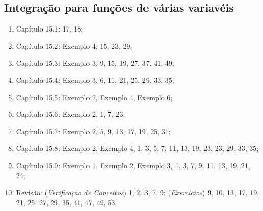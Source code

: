 \documentclass[11pt]{article}
\begin{document}
    \subsection{Integração para funções de várias variavéis}
    
     \begin{enumerate}
     \item Capítulo 15.1: 17, 18;
     \item Capítulo 15.2: Exemplo 4, 15, 23, 29;
     \item Capítulo 15.3: Exemplo 3, 9, 15, 19, 27, 37, 41, 49;
     \item Capítulo 15.4: Exemplo 3, 6, 11, 21, 25, 29, 33, 35;
     \item Capítulo 15.5: Exemplo 2, Exemplo 4, Exemplo 6;
     \item Capítulo 15.6: Exemplo 2, 1, 7, 23;
     \item Capítulo 15.7: Exemplo 2, 5, 9, 13, 17, 19, 25, 31;
     \item Capítulo 15.8: Exemplo 2, Exemplo 4, 1, 3, 5, 7, 11, 13, 19, 23, 23, 29, 33, 35; 
    \item Capítulo 15.9: Exemplo 1, Exemplo 2, Exemplo 3, 1, 3, 7, 9, 11, 13, 19, 21, 24; 
    \item Revisão: ({\it Verificação de Conceitos}) 1, 2, 3, 7, 9; ({\it Exercícios}) 9, 10, 13, 17, 19, 21, 25, 27, 29, 35, 41, 47, 49, 53.
     \end{enumerate}
     
\end{document}
